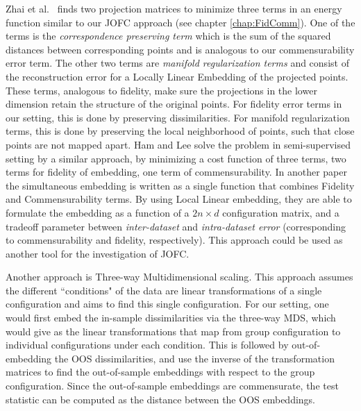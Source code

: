 \documentclass[12pt,oneside,final]{thesis}\usepackage[]{graphicx}\usepackage[]{color}
\begin{document}
 Zhai et al.~\cite{Zhai2010}  finds two projection matrices to minimize three terms in an energy function similar to our JOFC approach (see chapter \ref{chap:FidComm}). One of the terms is the \emph{correspondence preserving term} which is the sum of the squared distances between corresponding points and is analogous to our commensurability error term. The other two terms are \emph{manifold regularization terms} and consist of the reconstruction error for a Locally Linear Embedding of the projected points. These terms, analogous to fidelity, make sure the projections in the lower dimension retain the structure of the original points. For fidelity error terms in our setting, this is done by preserving dissimilarities. For manifold regularization terms, this is done by preserving the local neighborhood of points, such that close points are not mapped apart.
Ham and Lee\cite{HamLee2005a} solve the problem in semi-supervised setting by a similar approach, by minimizing a cost function of three terms, two terms for fidelity of embedding, one term of commensurability.
In another paper  the simultaneous embedding is written  as a single function  that combines Fidelity and Commensurability terms. By using Local Linear embedding,  they are able to formulate the embedding as a function of a $2n \times d$ configuration matrix, and a tradeoff parameter between \emph{inter-dataset} and \emph{intra-dataset error} (corresponding to commensurability and fidelity, respectively). This approach could be used as another tool for the investigation of JOFC.



Another approach is Three-way Multidimensional scaling\cite{3wayNMDS,borg+groenen:1997}.
 This approach assumes the  different ``conditions" of the data are linear transformations of a single configuration and aims to find this single configuration. For our setting, one would first embed the in-sample dissimilarities via the three-way MDS, which would give as the linear transformations that map from group configuration to individual configurations under each condition. This is followed by out-of-embedding the OOS dissimilarities, and use the inverse of the transformation matrices to find the out-of-sample embeddings with respect to the group configuration. Since the out-of-sample embeddings are commensurate, the test statistic can be computed as the distance between the OOS embeddings. 
\end{document}
